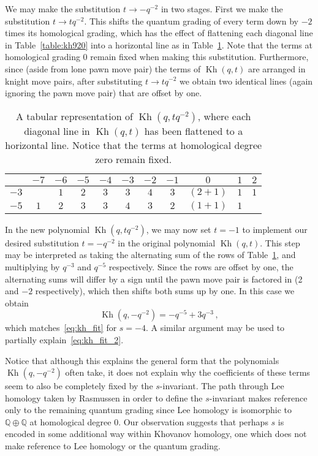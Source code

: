 \documentclass[11pt]{article}
\DeclareMathOperator{\Kh}{Kh}
\numberwithin{equation}{section}
\begin{document}
We may make the substitution $t\to-q^{-2}$ in two stages. First we make the substitution $t \to tq^{-2}$.  This shifts the quantum grading of every term down by $-2$ times its homological grading, which has the effect of flattening each diagonal line in Table~\ref{table:kh920} into a horizontal line as in Table~\ref{table:kh920flattened}.  Note that the terms at homological grading 0 remain fixed when making this substitution.  Furthermore,  since (aside from lone pawn move pair) the terms of $\Kh(q,t)$ are arranged in knight move pairs, after substituting $t \to tq^{-2}$ we obtain two identical lines (again ignoring the pawn move pair) that are offset by one.
\begin{table}
\begin{center}
  \begin{tabular}{|c||c|c|c|c|c|c|c|c|c|c|}
    \hline
     & \!$-7$\! & \!$-6$\! & \!$-5$\! & \!$-4$\! &
      \!$-3$\! & \!$-2$\! & \!$-1$\! & $0$ & $1$ & $2$  \\ \hline\hline
    $-3$ & & $1$&$2$ &$3$ & $3$&$4$ &$3$ & \!\!$(2+1)$\!\! & $1$ & $1$ \\ \hline
    $-5$ & $1$ & $2$ & $3$ & $3$ & $4$ & $3$ & $2$ & \!\!$(1+1)$\!\! & $1$ &  \\ \hline
  \end{tabular}
\end{center}
\caption{\small{A tabular representation of $\Kh(q,tq^{-2})$, where each diagonal line in $\Kh(q,t)$ has been flattened to a horizontal line.  Notice that the terms at homological degree zero remain fixed.}}
\label{table:kh920flattened}
\end{table}

In the new polynomial $\Kh(q,tq^{-2})$, we may now set $t=-1$ to implement our desired substitution $t = -q^{-2}$ in the original polynomial $\Kh(q,t)$.  This step may be interpreted as taking the alternating sum of the rows of Table~\ref{table:kh920flattened}, and multiplying by $q^{-3}$ and $q^{-5}$ respectively.  Since the rows are offset by one, the alternating sums will differ by a sign until the pawn move pair is factored in (2 and $-2$ respectively), which then shifts both sums up by one.  In this case we obtain
\begin{equation}
\Kh(q,-q^{-2})= -q^{-5}+3q^{-3}\,,
\end{equation}
which matches~\eqref{eq:kh_fit} for $s=-4$.  A similar argument may be used to partially explain~\eqref{eq:kh_fit_2}.



Notice that although this explains the general form that the polynomials  $\Kh(q,-q^{-2})$ often take, it does not explain why the coefficients of these terms seem to also be completely fixed by the $s$-invariant.
The path through Lee homology taken by Rasmussen in order to define the $s$-invariant makes reference only to the remaining quantum grading since Lee homology is isomorphic to $\mathbb{Q} \oplus \mathbb{Q}$ at homological degree $0$. Our observation suggests that perhaps $s$ is encoded in some additional way within Khovanov homology, one which does not make reference to Lee homology or the quantum grading.
\end{document}
